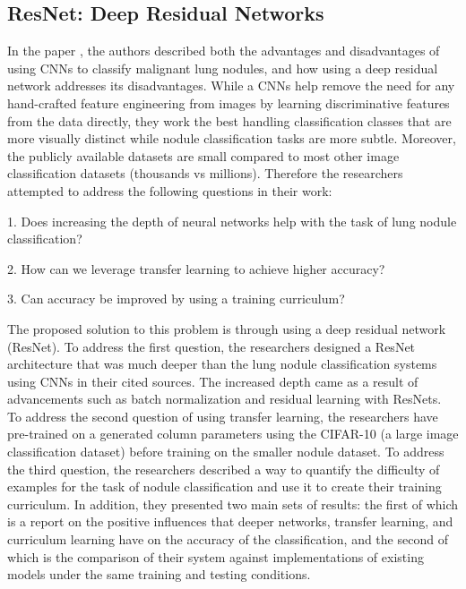 \documentclass[10pt,twocolumn,letterpaper]{article}
\begin{document}
   \subsection{ResNet: Deep Residual Networks} \label{sec:related-deep-residual-networks}
      In the paper \cite{deep_residual_network}, the authors described both the advantages and disadvantages of using
      CNNs to classify malignant lung nodules, and how using a deep residual network addresses its disadvantages.
      While a CNNs help remove the need for any hand-crafted feature engineering from images by learning discriminative
      features from the data directly, they work the best handling classification classes that are more visually distinct
      while nodule classification tasks are more subtle. Moreover, the publicly available datasets are small compared to
      most other image classification datasets (thousands vs millions). Therefore the researchers attempted to address
      the following questions in their work:

      1. Does increasing the depth of neural networks help with the task of lung nodule classification?

      2. How can we leverage transfer learning to achieve higher accuracy?

      3. Can accuracy be improved by using a training curriculum?

      The proposed solution to this problem is through using a deep residual network (ResNet). To address the first question,
      the researchers designed a ResNet architecture that was much deeper than the lung nodule classification systems
      using CNNs in their cited sources. The increased depth came as a result of advancements such as batch normalization
      and residual learning with ResNets. To address the second question of using transfer learning, the researchers
      have pre-trained on a generated column parameters using the CIFAR-10 (a large image classification dataset) before
      training on the smaller nodule dataset. To address the third question, the researchers described a way to quantify the
      difficulty of examples for the task of nodule classification and use it to create their training curriculum. In addition,
      they presented two main sets of results: the first of which is a report on the positive influences that deeper networks, transfer learning, and curriculum
      learning have on the accuracy of the classification, and the second of which is the comparison of their system
      against implementations of existing models under the same training and testing conditions.
\end{document}
